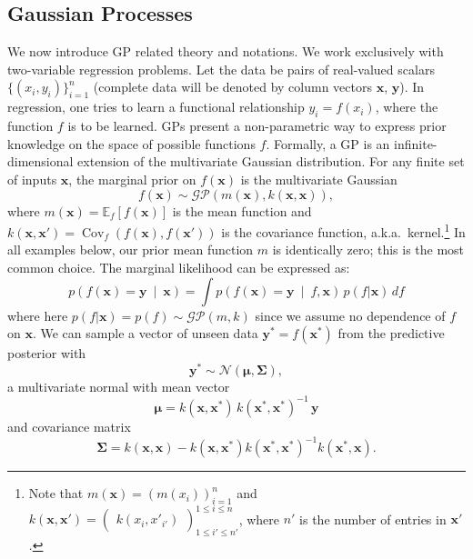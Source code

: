 \documentclass{article} %
\newcommand{\xbf}{\mathbf{x}}
\newcommand{\ybf}{\mathbf{y}}
\newcommand{\pn}[1]{\left( #1 \right)}
\newcommand{\bkt}[1]{\left[ #1 \right]}
\newcommand{\Ebkt}[2][]{\mathbb{E}_{#1}\bkt{#2}}
\newcommand{\mvert}{\ \middle\vert\ }
\DeclareMathOperator*{\Cov}{Cov}
\begin{document}
\subsection{Gaussian Processes}
We now introduce GP related theory and notations.
We work exclusively with two-variable regression problems.
Let the data be pairs of real-valued scalars $\{(x_i,y_i)\}_{i=1}^n$ (complete data will be denoted by column vectors $\mathbf{x}$, $\mathbf{y}$).
In regression, one tries to learn a functional relationship $y_i = f(x_i)$, where the function $f$ is to be learned.
GPs present a non-parametric way to express prior knowledge on the space of possible functions $f$.
Formally, a GP is an infinite-dimensional extension of the multivariate Gaussian distribution.
For any finite set of inputs $\xbf$, the marginal prior on $f(\xbf)$ is the multivariate Gaussian
\[
f(\xbf) \sim \mathcal{GP}(m(\xbf), k(\xbf,\xbf)),
\]
where $m(\xbf) = \Ebkt[f]{f(\xbf)}$ is the mean function and $k(\xbf,\xbf') = \Cov_f\pn{f(\xbf), f(\xbf')}$ is the covariance function, a.k.a.\ kernel.\footnote{
  Note that $m(\xbf) = \pn{m(x_i)}_{i=1}^{n}$ and $k(\xbf,\xbf') = \begin{pmatrix} k(x_i,x'_{i'}) \end{pmatrix}^{1 \leq i \leq n}_{1 \leq i' \leq n'}$, where $n'$ is the number of entries in $\xbf'$.
}
In all examples below, our prior mean function $m$ is identically zero; this is the most common choice.
The marginal likelihood can be expressed as:
\begin{equation}
\label{eq:marg}
p\pn{f(\xbf) = \ybf \mvert \xbf} = \int p\pn{f(\xbf) = \ybf \mvert f, \xbf}\, p(f|\xbf) \, df
\end{equation}
where here $p(f|\xbf) = p(f) \sim \mathcal{GP}(m,k)$ since we assume no dependence of $f$ on $\xbf$.
We can sample a vector of unseen data $\ybf^* = f(\xbf^*)$ from the predictive posterior with
\begin{equation}
\label{eq:gpsampler}
\ybf^* \sim \mathcal{N}(\bm{\mu},\bm{\Sigma}),
\end{equation}
a multivariate normal with mean vector
\begin{equation}
\label{eq:conditonalGaussianMean}
\bm{\mu} = k(\xbf,\xbf^*)\, k(\xbf^*,\xbf^*)^{-1}\, \ybf
\end{equation}
and covariance matrix
\begin{equation}
\label{eq:conditonalGaussianCovariance}
\bm{\Sigma} =  k(\xbf,\xbf) - k(\xbf,\xbf^*)k(\xbf^*,\xbf^*)^{-1} k(\xbf^*,\xbf).
\end{equation}
\end{document}
